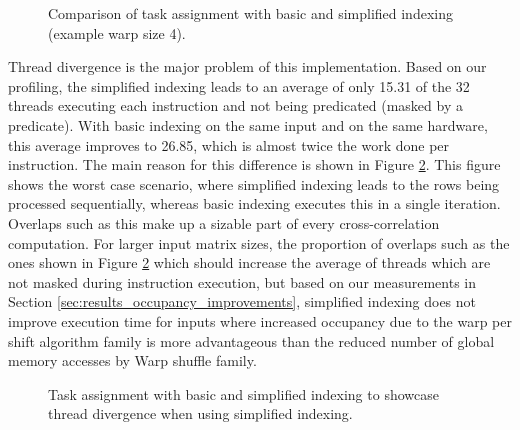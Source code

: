 \begin{figure}[ht]
	\centering
	\def\svgwidth{0.5\textwidth}
	\fontsize{8}{10}\selectfont
	
	\caption{Comparison of task assignment with basic and simplified indexing (example warp size 4).}
	\label{fig:warp_per_shift_simplified_indexing}
\end{figure}

Thread divergence is the major problem of this implementation. Based on our profiling, the simplified indexing leads to an average of only 15.31 of the 32 threads executing each instruction and not being predicated (masked by a predicate). With basic indexing on the same input and on the same hardware, this average improves to 26.85, which is almost twice the work done per instruction. The main reason for this difference is shown in Figure \ref{fig:warp_per_shift_thread_divergence}. This figure shows the worst case scenario, where simplified indexing leads to the rows being processed sequentially, whereas basic indexing executes this in a single iteration. Overlaps such as this make up a sizable part of every cross-correlation computation. For larger input matrix sizes, the proportion of overlaps such as the ones shown in Figure \ref{fig:warp_per_shift_thread_divergence} which should increase the average of threads which are not masked during instruction execution, but based on our measurements in Section \ref{sec:results_occupancy_improvements}, simplified indexing does not improve execution time for inputs where increased occupancy due to the warp per shift algorithm family is more advantageous than the reduced number of global memory accesses by Warp shuffle family.

\begin{figure}[ht]
	\centering
	\def\svgwidth{0.45\textwidth}
	\fontsize{8}{10}\selectfont
	
	\caption{Task assignment with basic and simplified indexing to showcase thread divergence when using simplified indexing.}
	\label{fig:warp_per_shift_thread_divergence}
\end{figure}

